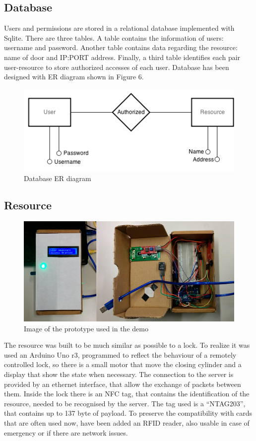 \documentclass[conference]{IEEEtran}
\begin{document}
\subsection{Database}

Users and permissions are stored in a relational database implemented with Sqlite. There are three tables. A table contains the information of users: username and password. Another table contains data regarding the resource: name of door and IP:PORT address.
Finally, a third table identifies each pair user-resource to store authorized accesses of each user.
Database has been designed with ER diagram shown in Figure 6.

\begin{figure}[h]
\centering
\includegraphics[scale=0.5]{fig6}
\caption{Database ER diagram}
\label{fig_sim}
\end{figure}

\subsection{Resource}

\begin{figure}[h]
\centering
\includegraphics[scale=0.3]{resource}
\caption{Image of the prototype used in the demo}
\label{resource}
\end{figure}

The resource was built to be much similar as possible to a lock. To realize it was used an Arduino Uno r3, programmed to reflect the behaviour of a remotely controlled lock, so there is a small motor that move the closing cylinder and a display that show the state when necessary.
The connection to the server is provided by an ethernet interface, that allow the exchange of packets between them. 
Inside the lock there is an NFC tag, that contains the identification of the resource, needed to be recognised by the server. The tag used is a ``NTAG203'', that contains up to 137 byte of payload.
To preserve the compatibility with cards that are often used now, have been added an RFID reader, also usable in case of emergency or if there are network issues.
\end{document}
